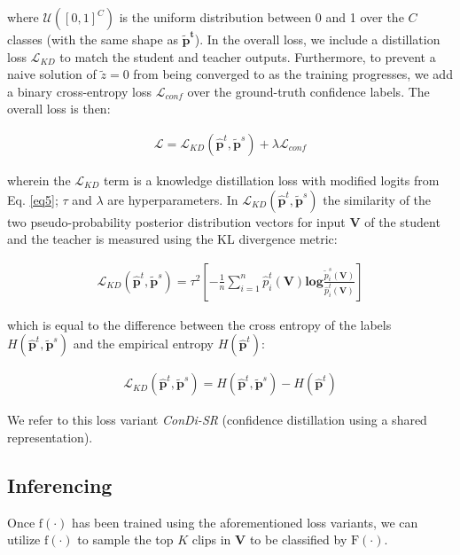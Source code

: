 \documentclass[a4paper,conference]{IEEEtran}
\begin{document}
where $\mathcal{U}([0,1]^C)$ is the uniform distribution between 0 and 1 over the $C$ classes (with the same shape as $\mathbf{\tilde{p}^t}$). In the overall loss, we include a distillation loss $\mathcal{L}_{\mathit{KD}}$ to match the student and teacher outputs. Furthermore, to prevent a naive solution of $\tilde{z} = 0$ from being converged to as the training progresses, we add a binary cross-entropy loss $\mathcal{L}_{conf}$ over the ground-truth confidence labels. The overall loss is then:

\begin{eqnarray}
\mathcal{L} = 
\mathcal{L}_{\mathit{KD}}(\hat{\mathbf{p}}^t, \tilde{\mathbf{p}}^s) + \lambda \mathcal{L}_{conf}
\label{lossfunc}
\end{eqnarray}

wherein the $\mathcal{L}_{\mathit{KD}}$ term is a knowledge distillation loss with modified logits from Eq. \ref{eq5}; $\tau$ and $\lambda$ are hyperparameters. In $\mathcal{L}_{\mathit{KD}}(\hat{\mathbf{p}}^t, \tilde{\mathbf{p}}^s)$ the similarity of the two pseudo-probability posterior distribution vectors for input $\mathbf{V}$ of the student and the teacher is measured using the KL divergence metric:

\begin{eqnarray}
\mathcal{L}_{\mathit{KD}}(\hat{\mathbf{p}}^t, \tilde{\mathbf{p}}^s) = 
\tau^2 [ -\frac{1}{n} \sum_{i=1}^{n} \hat{p}^t_i(\mathbf{V}) \mathbf{log}\frac{\tilde{p}_i^s(\mathbf{V})}{\hat{p}_i^t(\mathbf{V})} ] 
\end{eqnarray}


which is equal to the difference between the cross entropy of the labels $H(\hat{\mathbf{p}}^t, \tilde{\mathbf{p}}^s)$ and the empirical entropy $H(\hat{\mathbf{p}}^t)$:

\begin{eqnarray}
\mathcal{L}_{\mathit{KD}}(\hat{\mathbf{p}}^t, \tilde{\mathbf{p}}^s) = H(\hat{\mathbf{p}}^t, \tilde{\mathbf{p}}^s) - H(\hat{\mathbf{p}}^t)
\end{eqnarray}

We refer to this loss variant \textit{ConDi-SR} (confidence distillation using a shared representation).

\subsection{Inferencing}
\label{algorithmdetails}

Once $\mathrm{f}(\cdot)$ has been trained using the aforementioned loss variants, we can utilize $\mathrm{f}(\cdot)$ to sample the top $K$ clips in $\mathbf{V}$ to be classified by $\mathrm{F}(\cdot)$.
\end{document}
